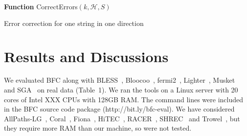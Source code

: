 \documentclass{bioinfo}
\begin{document}
\begin{methods}
\begin{algorithm}[ht]
\DontPrintSemicolon
\footnotesize
{}
\BlankLine
\textbf{Function} {\sc CorrectErrors}$(k, \mathcal{H}, S)$
\caption{Error correction for one string in one direction}
\end{algorithm}

\end{methods}

\section{Results and Discussions}

We evaluated BFC along with BLESS~\citep{Heo:2014aa},
Bloocoo~\citep{Drezen:2014aa}, fermi2~\citep{Li:2012fk},
Lighter~\citep{Song:2014aa}, Musket~\citep{Liu:2013ac} and
SGA~\citep{Simpson:2012aa} on real data (Table~1). We ran the tools on a Linux
server with 20 cores of Intel XXX CPUs with 128GB RAM. The command lines were
included in the BFC source code package (http://bit.ly/bfc-eval).  We have
considered AllPaths-LG~\citep{Gnerre:2011ys}, Coral~\citep{Salmela:2011aa},
Fiona~\citep{Schulz:2014aa}, HiTEC~\citep{Ilie:2011fk},
RACER~\citep{Ilie:2013aa}, SHREC~\citep{Schroder:2009uq} and
Trowel~\citep{Lim:2014aa}, but they require more RAM than our machine, so were
not tested.
\end{document}
